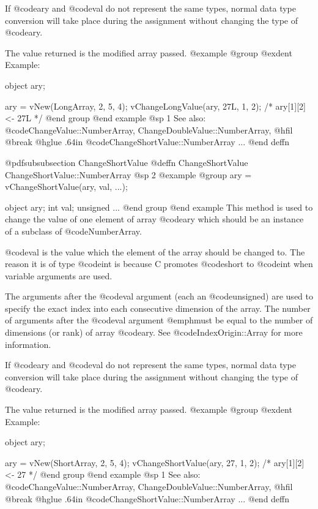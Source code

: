 If @code{ary} and @code{val} do not represent the same types, normal
data type conversion will take place during the assignment without
changing the type of @code{ary}.

The value returned is the modified array passed.
@example
@group
@exdent Example:

object  ary;

ary = vNew(LongArray, 2, 5, 4);
vChangeLongValue(ary, 27L, 1, 2);
/*  ary[1][2] <- 27L  */
@end group
@end example
@sp 1
See also:  @code{ChangeValue::NumberArray, ChangeDoubleValue::NumberArray,}
@hfil @break @hglue .64in @code{ChangeShortValue::NumberArray}  ...
@end deffn









@pdfsubsubsection {ChangeShortValue}
@deffn {ChangeShortValue} ChangeShortValue::NumberArray
@sp 2
@example
@group
ary = vChangeShortValue(ary, val, ...);

object    ary;
int       val;
unsigned  ...
@end group
@end example
This method is used to change the value of one element of
array @code{ary} which should be an instance of a subclass of
@code{NumberArray}.

@code{val} is the value which the element of the array should be changed
to.  The reason it is of type @code{int} is because C promotes @code{short}
to @code{int} when variable arguments are used.

The arguments after the @code{val} argument (each an @code{unsigned})
are used to specify the exact index into each consecutive dimension of
the array.  The number of arguments after the @code{val} argument
@emph{must} be equal to the number of dimensions (or rank) of array
@code{ary}.  See @code{IndexOrigin::Array} for more information.

If @code{ary} and @code{val} do not represent the same types, normal
data type conversion will take place during the assignment without
changing the type of @code{ary}.

The value returned is the modified array passed.
@example
@group
@exdent Example:

object  ary;

ary = vNew(ShortArray, 2, 5, 4);
vChangeShortValue(ary, 27, 1, 2);
/*  ary[1][2] <- 27  */
@end group
@end example
@sp 1
See also:  @code{ChangeValue::NumberArray, ChangeDoubleValue::NumberArray,}
@hfil @break @hglue .64in @code{ChangeShortValue::NumberArray}  ...
@end deffn








